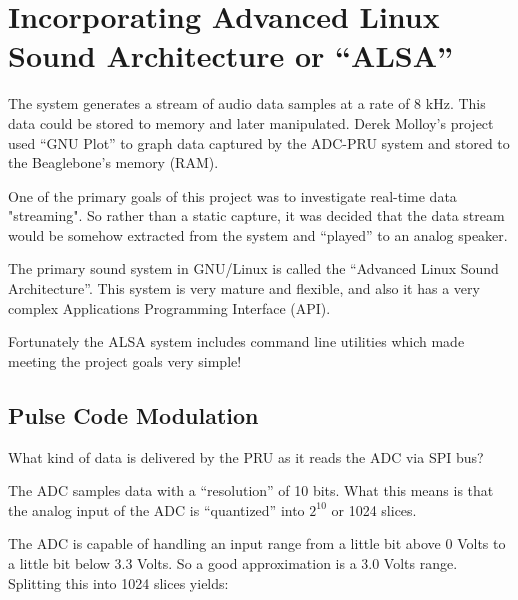 %
%
%

\chapter{Incorporating Advanced Linux Sound Architecture or ``ALSA''}

The system generates a stream of audio data samples at a rate of 8 kHz.  This data could be stored to memory and later manipulated.  Derek Molloy's project used ``GNU Plot'' to graph data captured by the ADC-PRU system and stored to the Beaglebone's memory (RAM).

One of the primary goals of this project was to investigate real-time data "streaming".  So rather than a static capture, it was decided that the data stream would be somehow extracted from the system and ``played'' to an analog speaker.

The primary sound system in GNU/Linux is called the ``Advanced Linux Sound Architecture''.  This system is very mature and flexible, and also it has a very complex Applications Programming Interface (API).

Fortunately the ALSA system includes command line utilities which made meeting the project goals very simple!

\section{Pulse Code Modulation}

What kind of data is delivered by the PRU as it reads the ADC via SPI bus?

The ADC samples data with a ``resolution'' of 10 bits.  What this means is that the analog input of the ADC is ``quantized'' into $2^{10}$ or 1024 slices.

The ADC is capable of handling an input range from a little bit above 0 Volts to a little bit below 3.3 Volts.  So a good approximation is a 3.0 Volts range.  Splitting this into 1024 slices yields:

